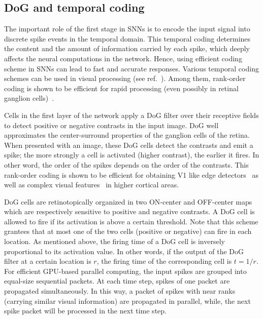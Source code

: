 \documentclass[preprint,5p,12pt,twocolumn]{article}
\begin{document}
\subsection*{DoG and temporal coding}
The important role of the first stage in SNNs is to encode the input signal into discrete spike events in the temporal domain. This temporal coding  determines the content and the amount of information carried by each spike, which deeply affects the neural computations in the network. Hence, using efficient coding scheme in SNNs can lead to fast and accurate responses. Various temporal coding schemes can be used in visual processing (see ref.~\cite{thorpe2001spike}). Among them, rank-order coding is shown to be efficient for rapid processing (even possibly in retinal ganglion cells)~\cite{van2001rate,portelli2016rank}.

Cells in the first layer of the network apply a DoG filter over their receptive fields to detect positive or negative contrasts in the input image. DoG well approximates the center-surround properties of the ganglion cells of the retina. When presented with an image, these DoG cells detect the contrasts and emit a spike; the more strongly a cell is activated (higher contrast), the earlier it fires.  In other word, the order of the spikes depends on the order of the contrasts. This rank-order coding is shown to be efficient for obtaining V1 like edge detectors~\cite{delorme2001networks} as well as complex visual features~\cite{masquelier2007unsupervised,kheradpisheh2016bio}  in higher cortical areas.

DoG cells are retinotopically organized in two ON-center and OFF-center maps which are respectively sensitive to positive and negative contrasts. A DoG cell is allowed to fire if its activation is above a certain threshold. Note that this scheme grantees that at most one of the two cells (positive or negative) can fire in each location.  As mentioned above, the firing time of a DoG cell is inversely proportional to its activation value. In other words, if the output of the DoG filter at a certain location is $r$, the firing time of the corresponding cell is $t=1/r$. For efficient GPU-based parallel computing, the input spikes are grouped into equal-size sequential packets. At each time step, spikes of one packet are propagated simultaneously. In this way, a packet of spikes with near ranks (carrying similar visual information) are propagated in parallel, while, the next spike packet will be processed in the next time step.
\end{document}
